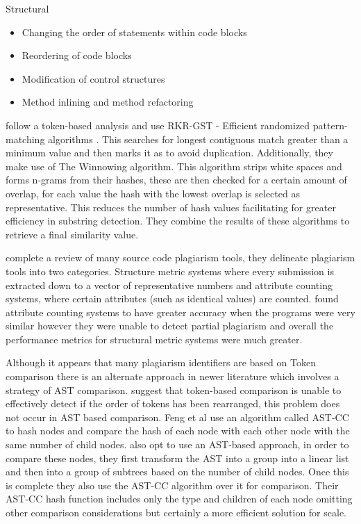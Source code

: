\documentclass[jou,apacite]{apa6}
\begin{document}
Structural
\begin{itemize}
  \setlength\itemsep{-0.5em}
  \item Changing the order of statements within code blocks
  \item Reordering of code blocks
  \item Modification of control structures
  \item Method inlining and method refactoring
\end{itemize}

\cite{Duric2013} follow a token-based analysis and use RKR-GST - Efficient randomized pattern-matching algorithms \cite{Rabin1987}. This searches for longest contiguous match greater than a minimum value and then marks it as to avoid duplication. Additionally, they make use of The Winnowing algorithm. 
This algorithm strips white spaces and forms n-grams from their hashes, these are then checked for a certain amount of overlap, for each value the hash with the lowest overlap is selected as representative. This reduces the number of hash values facilitating for greater efficiency in substring detection. They combine the results of these algorithms to retrieve a final similarity value.

\cite{Lancaster2005} complete a review of many source code plagiarism tools, they delineate plagiarism tools into two categories. Structure metric systems where every submission is extracted down to a vector of representative numbers and attribute counting systems, where certain attributes (such as identical values) are counted. \cite{Verco1996} found attribute counting systems to have greater accuracy when the programs were very similar however they were unable to detect partial plagiarism and overall the performance metrics for structural metric systems were much greater. 

Although it appears that many plagiarism identifiers are based on Token comparison there is an alternate approach in newer literature which involves a strategy of AST comparison. \cite{Feng2013} suggest that token-based comparison is unable to effectively detect if the order of tokens has been rearranged, this problem does not occur in AST based comparison. Feng et al use an algorithm called AST-CC to hash nodes and compare the hash of each node with each other node with the same number of child nodes. \cite{Zhao2015} also opt to use an AST-based approach, in order to compare these nodes, they first transform the AST into a group into a linear list and then into a group of subtrees based on the number of child nodes. Once this is complete they also use the AST-CC algorithm over it for comparison. Their AST-CC hash function includes only the type and children of each node omitting other comparison considerations but certainly a more efficient solution for scale.
\end{document}
